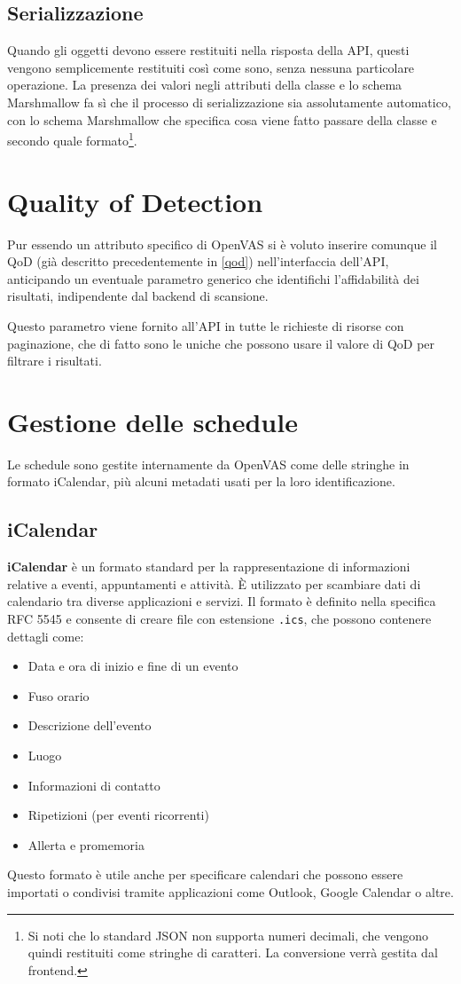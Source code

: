 \subsection{Serializzazione}
Quando gli oggetti devono essere restituiti nella risposta della API, questi vengono semplicemente restituiti così come sono, senza nessuna particolare operazione. La presenza dei valori negli attributi della classe e lo schema Marshmallow fa sì che il processo di serializzazione sia assolutamente automatico, con lo schema Marshmallow che specifica cosa viene fatto passare della classe e secondo quale formato\footnote{Si noti che lo standard JSON non supporta numeri decimali, che vengono quindi restituiti come stringhe di caratteri. La conversione verrà gestita dal frontend.}.

\section{Quality of Detection}
Pur essendo un attributo specifico di OpenVAS si è voluto inserire comunque il QoD (già descritto precedentemente in \ref{qod}) nell'interfaccia dell'API, anticipando un eventuale parametro generico che identifichi l'affidabilità dei risultati, indipendente dal backend di scansione.

Questo parametro viene fornito all'API in tutte le richieste di risorse con paginazione, che di fatto sono le uniche che possono usare il valore di QoD per filtrare i risultati.

\section{Gestione delle schedule}
Le schedule sono gestite internamente da OpenVAS come delle stringhe in formato iCalendar, più alcuni metadati usati per la loro identificazione.

\subsection{iCalendar}
\textbf{iCalendar} è un formato standard per la rappresentazione di informazioni relative a eventi, appuntamenti e attività. È utilizzato per scambiare dati di calendario tra diverse applicazioni e servizi. Il formato è definito nella specifica RFC 5545 \cite{rfc5545} e consente di creare file con estensione \texttt{.ics}, che possono contenere dettagli come:
\begin{itemize}
    \item Data e ora di inizio e fine di un evento
    \item Fuso orario
    \item Descrizione dell'evento
    \item Luogo
    \item Informazioni di contatto
    \item Ripetizioni (per eventi ricorrenti)
    \item Allerta e promemoria
\end{itemize}
Questo formato è utile anche per specificare calendari che possono essere importati o condivisi tramite applicazioni come Outlook, Google Calendar o altre.

